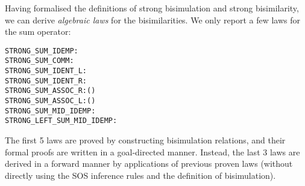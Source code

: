 Having formalised  the definitions of strong bisimulation and strong bisimilarity,
we can derive  \emph{algebraic laws} for the 
 bisimilarities. We only report a few laws for 
 the sum operator:
\begin{alltt}
STRONG_SUM_IDEMP:          \HOLTokenTurnstile{}  \HOLSymConst{\ensuremath{+}}  \HOLSymConst{\HOLTokenStrongEQ}   
STRONG_SUM_COMM:           \HOLTokenTurnstile{}  \HOLSymConst{\ensuremath{+}}  \HOLSymConst{\HOLTokenStrongEQ}  \HOLSymConst{\ensuremath{+}} 
STRONG_SUM_IDENT_L:        \HOLTokenTurnstile{}  \HOLSymConst{\ensuremath{+}}  \HOLSymConst{\HOLTokenStrongEQ} 
STRONG_SUM_IDENT_R:        \HOLTokenTurnstile{}  \HOLSymConst{\ensuremath{+}}  \HOLSymConst{\HOLTokenStrongEQ} 
STRONG_SUM_ASSOC_R:        \HOLTokenTurnstile{}  \HOLSymConst{\ensuremath{+}}  \HOLSymConst{\ensuremath{+}}  \HOLSymConst{\HOLTokenStrongEQ}  \HOLSymConst{\ensuremath{+}} ( \HOLSymConst{\ensuremath{+}} )
STRONG_SUM_ASSOC_L:        \HOLTokenTurnstile{}  \HOLSymConst{\ensuremath{+}} ( \HOLSymConst{\ensuremath{+}} ) \HOLSymConst{\HOLTokenStrongEQ}  \HOLSymConst{\ensuremath{+}}  \HOLSymConst{\ensuremath{+}} 
STRONG_SUM_MID_IDEMP:      \HOLTokenTurnstile{}  \HOLSymConst{\ensuremath{+}}  \HOLSymConst{\ensuremath{+}}  \HOLSymConst{\HOLTokenStrongEQ}  \HOLSymConst{\ensuremath{+}} 
STRONG_LEFT_SUM_MID_IDEMP: \HOLTokenTurnstile{}  \HOLSymConst{\ensuremath{+}}  \HOLSymConst{\ensuremath{+}}  \HOLSymConst{\ensuremath{+}}  \HOLSymConst{\HOLTokenStrongEQ}  \HOLSymConst{\ensuremath{+}}  \HOLSymConst{\ensuremath{+}} 
\end{alltt}

The
first 5 laws are proved
 by constructing bisimulation
relations, and their formal proofs are written in
a goal-directed manner. Instead, the
last 3 laws are derived in a forward manner by applications of
previous proven laws (without directly using the SOS
inference rules and the definition of bisimulation).
 
